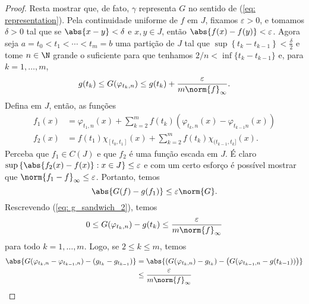 \begin{proof}
    Resta mostrar que, de fato, \( \gamma \) representa \( G \) no sentido de (\ref{eq: representation}).
    Pela continuidade uniforme de \( f \) em \( J \), fixamos \( \varepsilon > 0 \), e tomamos \( \delta > 0 \) tal que se \( \abs{ x - y } < \delta \) e \( x, y \in J \), então \( \abs{ f(x) - f(y) } < \varepsilon \).
    Agora seja \( a = t_{ 0 } < t_{ 1 } < \cdots < t_{ m } = b \) uma partição de \( J \) tal que \( \sup \left\{ t_{ k } - t_{ k-1 } \right\} < \frac{ \delta }{ 2 } \) e tome \( n \in \N \) grande o suficiente para que tenhamos \( 2/n < \inf \{t_{ k } - t_{ k-1 }\} \) e, para \( k = 1, \dots, m \),
    \begin{equation}
        g(t_{ k }) \leq G(\varphi_{ t_{ k }, n }) \leq g(t_{ k }) + \frac{ \varepsilon }{ m \norm{ f }_{ \infty } }
        \label{eq: g_sandwich_2}
    .\end{equation}
    Defina em \( J \), então, as funções
    \begin{align*}
        f_{ 1 }(x)
        &= \varphi_{ t_{ 1 }, n }(x) + \sum_{ k=2 }^{ m } f(t_{ k }) \left(
            \varphi_{ t_{ k }, n }(x) - \varphi_{ t_{ k-1 }n }(x)
        \right) \\
        f_{ 2 }(x)
        &= f(t_{ 1 }) \chi_{ [t_{ 0 }, t_{ 1 }] }(x) +
        \sum_{ k=2 }^{ m } f(t_{ k }) \chi_{ (t_{ k-1 }, t_{ k }] }(x)
    .\end{align*}
    Perceba que \( f_{ 1 } \in C(J) \) e que \( f_{ 2 } \) é uma função escada em \( J \).
    É claro \( \sup \left\{ \abs{ f_{ 2 }(x) - f(x) } : x \in J \right\} \leq \varepsilon \) e com um certo esforço é possível mostrar que \( \norm{ f_{ 1 } - f }_{ \infty } \leq \varepsilon \).
    Portanto, temos
    \begin{equation}
        \abs{ G(f) - g(f_{ 1 }) } \leq \varepsilon \norm{ G }
        \label{eq: triangle_1}
    .\end{equation}
    Rescrevendo (\ref{eq: g_sandwich_2}), temos \[
        0 \leq G(\varphi_{ t_{ k }, n }) - g(t_{ k }) \leq \frac{ \varepsilon }{ m \norm{ f }_{ \infty } }
    \]
    para todo \( k = 1, \dots, m \).
    Logo, se \( 2 \leq k \leq m \), temos
    \begin{align*}
        \abs{ G(\varphi_{ t_{ k }, n } - \varphi_{ t_{ k-1 }, n }) - (g_{ t_{ k } } - g_{ t_{ k-1 } })}
        &= \abs{ \left(
            G(\varphi_{ t_{ k }, n }) - g_{ t_{ k } }
        \right) -
        \left(
            G(\varphi_{ t_{ k-1 }, n } - g(t_{ k-1 }))
        \right)} \\
        &\leq \frac{ \varepsilon }{ m \norm{ f }_{ \infty } }

\end{align*}
\end{proof}
